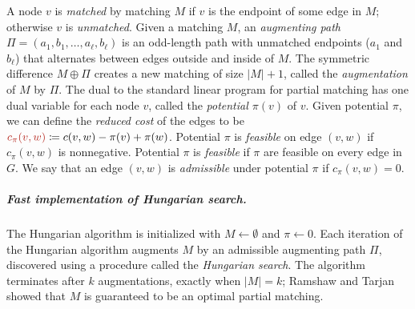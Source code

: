 \documentclass[a4paper,UKenglish,nolineno]{socg-lipics-v2019}
\makeatletter
\def\abs#1{\mathopen| #1 \mathclose|}		%
\def\EMPH#1{\textcolor{BrickRed}{{\emph{#1}}}}
\def\n@te#1{\textsf{\boldmath \textbf{$\langle\!\langle$#1$\rangle\!\rangle$}}\leavevmode}
\def\note#1{\textcolor{red}{\n@te{#1}}}
\makeatother
\begin{document}
A node $v$ is \EMPH{matched} by matching $M$ if $v$ is the endpoint of some edge in $M$;
otherwise $v$ is \EMPH{unmatched}.
Given a matching $M$, an \EMPH{augmenting path}
$\Pi = (a_1, b_1, \ldots, a_\ell, b_\ell)$ is an odd-length path with unmatched
endpoints ($a_1$ and $b_\ell$) that alternates between edges outside and inside of $M$.
The symmetric difference $M \oplus \Pi$ creates a new matching of size $\abs{M}+1$, called the \EMPH{augmentation} of $M$ by $\Pi$.
%
The dual to the standard linear program for partial matching has one dual variable
for each node $v$, called the \EMPH{potential $\pi(v)$} of $v$.
Given potential $\pi$, we can define the \EMPH{reduced cost} of the edges to be
$\EMPH{$c_\pi(v, w)$} \coloneqq c(v, w) - \pi(v) + \pi(w)$.
Potential $\pi$ is \EMPH{feasible} on edge $(v,w)$ if $c_\pi(v, w)$ is nonnegative.
Potential $\pi$ is \EMPH{feasible} if $\pi$ are feasible on every edge in $G$.
We say that an edge $(v, w)$ is \EMPH{admissible} under potential $\pi$ if $c_\pi(v, w) = 0$.

\subparagraph{Fast implementation of Hungarian search.}

The Hungarian algorithm is initialized with $M \gets \emptyset$ and $\pi \gets 0$.
Each iteration of the Hungarian algorithm augments $M$ by an admissible
augmenting path $\Pi$, discovered using a procedure called the
\EMPH{Hungarian search}.
The algorithm terminates after $k$ augmentations, exactly when $\abs{M} = k$;
Ramshaw and Tarjan~\cite{RT12} showed that $M$ is guaranteed to be an optimal partial matching.
\end{document}
